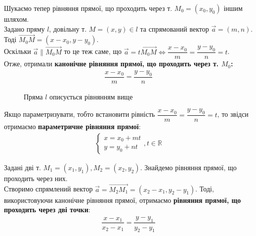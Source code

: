 \documentclass[a4paper, 10pt]{extarticle}
\theoremstyle{theoremdd}
\theoremstyle{theoremdd}
\theoremstyle{theoremdd}
\theoremstyle{theoremdd}
\theoremstyle{theoremdd}
\theoremstyle{theoremdd}
\theoremstyle{theoremdd}
\theoremstyle{theoremdd}
\begin{document}
Шукаємо тепер рівняння прямої, що проходить через т. $M_0 = (x_0, y_0)$ іншим шляхом.\\
Задано пряму $l$, довільну т. $M = (x,y) \in l$ та спрямований вектор $\vec{a} = (m,n)$. Тоді $\overrightarrow{M_0M} = (x-x_0, y-y_0)$.\\
Оскільки $\vec{a} \parallel \overrightarrow{M_0M}$ то це теж саме, що $\vec{a} = t \overrightarrow{M_0 M} \iff
\dfrac{x-x_0}{m} = \dfrac{y-y_0}{n} = t$.\\
Отже, отримали \textbf{канонічне рівняння прямої, що проходить через т. $M_0$:}
\begin{align*}
\dfrac{x-x_0}{m} = \dfrac{y-y_0}{n}
\end{align*}

\begin{figure}[H]
\centering
{}
\caption*{Пряма $l$ описується рівнянням вище}
\end{figure}

Якщо параметризувати, тобто встановити рівність $\dfrac{x-x_0}{m} = \dfrac{y-y_0}{n} = t$, то звідси отримаємо \textbf{параметричне рівняння прямої}:
\begin{align*}
\begin{cases}
x = x_0 + mt\\
y = y_0 + nt
\end{cases}, t \in \mathbb{R}
\end{align*}

Задані дві т. $M_1 = (x_1,y_1), M_2 = (x_2,y_2)$. Знайдемо рівняння прямої, що проходить через них.\\
Створимо спрямлений вектор $\vec{a} = \overrightarrow{M_2M_1} = (x_2-x_1,y_2-y_1)$. Тоді, використовуючи канонічне рівняння прямої, отримаємо \textbf{рівняння прямої, що проходить через дві точки}:
\begin{align*}
\dfrac{x-x_1}{x_2-x_1} = \dfrac{y-y_1}{y_2-y_1}
\end{align*}
\end{document}
